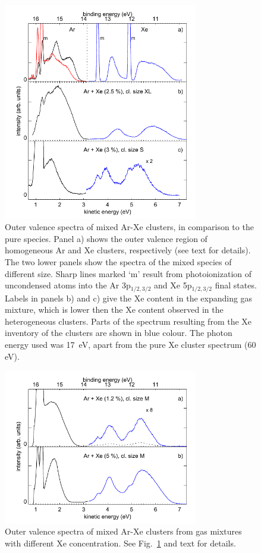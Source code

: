 \begin{figure}[ht]
 \centering
 \includegraphics[width=8.5cm]{pics/figure_oval_1.pdf}
 \caption{
 Outer valence spectra of mixed Ar-Xe clusters, in comparison to the pure species. Panel a) shows the outer valence region of homogeneous Ar and Xe clusters, respectively (see text for details). The two lower panels show the spectra of the mixed species of different size. Sharp lines marked `m' result from photoionization of uncondensed atoms into the Ar 3p$_{1/2,3/2}$ and Xe 5p$_{1/2,3/2}$ final states. Labels in panels b) and c) give the Xe content in the expanding gas mixture, which is lower then the Xe content observed in the heterogeneous clusters. Parts of the spectrum resulting from the Xe inventory of the clusters are shown in blue colour. The photon energy used was 17~eV, apart from the pure Xe cluster spectrum (60 eV).
}
 \label{figure:oval1}
\end{figure}


\begin{figure}[ht]
 \centering
 \includegraphics[width=8.5cm]{pics/figure_oval_2.pdf}
 \caption{
Outer valence spectra of mixed Ar-Xe clusters from gas mixtures with different Xe concentration. See Fig.\ \ref{figure:oval1} and text for details.
}
 \label{figure:oval2}
\end{figure}

